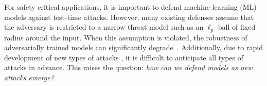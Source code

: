 For safety critical applications, it is important to defend machine learning (ML) models against test-time attacks.  However, many existing defenses \citep{madry2017towards, zhang2019theoretically, croce2020robustbench} assume that the adversary is restricted to a narrow threat model such as an $\ell_p$ ball of fixed radius around the input.
When this assumption is violated, the robustness of adversarially trained models can significantly degrade~\citep{dai2023multirobustbench, kaufmann2019testing}. Additionally, due to rapid development of new types of attacks \citep{XiaoZ0HLS18, LaidlawF19, laidlaw2020perceptual, kaufmann2019testing}, it is difficult to anticipate all types of attacks in advance.  This raises the question: \emph{how can we defend models as new attacks emerge?}%

